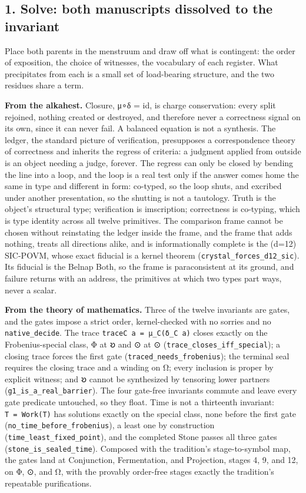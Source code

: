 \hypertarget{solve-both-manuscripts-dissolved-to-the-invariant}{%
\subsection{1. Solve: both manuscripts dissolved to the
invariant}\label{solve-both-manuscripts-dissolved-to-the-invariant}}

Place both parents in the menstruum and draw off what is contingent: the
order of exposition, the choice of witnesses, the vocabulary of each
register. What precipitates from each is a small set of load-bearing
structure, and the two residues share a term.

\textbf{From the alkahest.} Closure, μ∘δ = id, is charge conservation:
every split rejoined, nothing created or destroyed, and therefore never
a correctness signal on its own, since it can never fail. A balanced
equation is not a synthesis. The ledger, the standard picture of
verification, presupposes a correspondence theory of correctness and
inherits the regress of criteria: a judgment applied from outside is an
object needing a judge, forever. The regress can only be closed by
bending the line into a loop, and the loop is a real test only if the
answer comes home the same in type and different in form: co-typed, so
the loop shuts, and excribed under another presentation, so the shutting
is not a tautology. Truth is the object's structural type; verification
is imscription; correctness is co-typing, which is type identity across
all twelve primitives. The comparison frame cannot be chosen without
reinstating the ledger inside the frame, and the frame that adds
nothing, treats all directions alike, and is informationally complete is
the (d=12) SIC-POVM, whose exact fiducial is a kernel theorem
(\texttt{crystal\_forces\_d12\_sic}). Its fiducial is the Belnap Both,
so the frame is paraconsistent at its ground, and failure returns with
an address, the primitives at which two types part ways, never a scalar.

\textbf{From the theory of mathematics.} Three of the twelve invariants
are gates, and the gates impose a strict order, kernel-checked with no
sorries and no \texttt{native\_decide}. The trace
\texttt{traceC\ a\ =\ μ\_C(δ\_C\ a)} closes exactly on the
Frobenius-special class, Φ at 𐑹 and ⊙ at ⊙
(\texttt{trace\_closes\_iff\_special}); a closing trace forces the first
gate (\texttt{traced\_needs\_frobenius}); the terminal seal requires the
closing trace and a winding on Ω; every inclusion is proper by explicit
witness; and 𐑹 cannot be synthesized by tensoring lower partners
(\texttt{g1\_is\_a\_real\_barrier}). The four gate-free invariants
commute and leave every gate predicate untouched, so they float. Time is
not a thirteenth invariant: \texttt{T\ =\ Work(T)} has solutions exactly
on the special class, none before the first gate
(\texttt{no\_time\_before\_frobenius}), a least one by construction
(\texttt{time\_least\_fixed\_point}), and the completed Stone passes all
three gates (\texttt{stone\_is\_sealed\_time}). Composed with the
tradition's stage-to-symbol map, the gates land at Conjunction,
Fermentation, and Projection, stages 4, 9, and 12, on Φ, ⊙, and Ω, with
the provably order-free stages exactly the tradition's repeatable
purifications.

